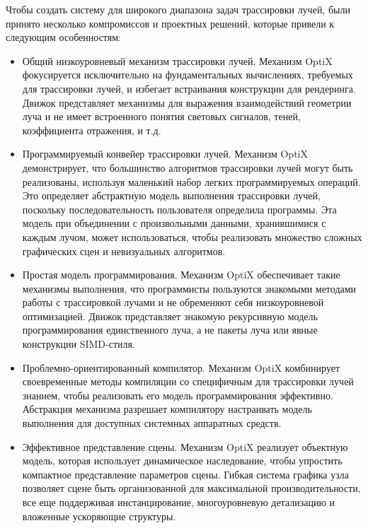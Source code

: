 Чтобы создать систему для широкого диапазона задач трассировки лучей, были принято несколько компромиссов и проектных решений, которые привели к следующим особенностям:
\begin{itemize}
 \item Общий низкоуровневый механизм трассировки лучей. 
 Механизм OptiX фокусируется исключительно на фундаментальных вычислениях, требуемых для трассировки лучей, и избегает встраивания конструкции для рендеринга. 
 Движок представляет механизмы для выражения взаимодействий геометрии луча и не имеет встроенного понятия световых сигналов, теней, коэффициента отражения, и т.д.

\item Программируемый конвейер трассировки лучей. 
Механизм OptiX демонстрирует, что большинство алгоритмов трассировки лучей могут быть реализованы, используя маленький набор легких программируемых операций. 
Это определяет абстрактную модель выполнения трассировки лучей, поскольку последовательность пользователя определила программы. 
Эта модель при объединении с произвольными данными, хранившимися с каждым лучом, может использоваться, чтобы реализовать множество сложных графических сцен и невизуальных алгоритмов.

\item Простая модель программирования. 
Механизм OptiX обеспечивает такие механизмы выполнения, что программисты пользуются знакомыми методами работы с трассировкой лучами и  не обременяют себя низкоуровневой оптимизацией. 
Движок представляет знакомую рекурсивную модель программирования единственного луча, а не пакеты луча или явные конструкции SIMD-стиля. 

\item Проблемно-ориентированный компилятор. 
Механизм OptiX комбинирует своевременные методы компиляции со специфичным для трассировки лучей знанием, чтобы реализовать его модель программирования эффективно. 
Абстракция механизма разрешает компилятору настраивать модель выполнения для доступных системных аппаратных средств.

\item Эффективное представление сцены. 
Механизм OptiX реализует объектную модель, которая использует динамическое наследование, чтобы упростить компактное представление параметров сцены. 
Гибкая система графика узла позволяет сцене быть организованной для максимальной производительности, все еще поддерживая инстанцирование, многоуровневую детализацию и вложенные ускоряющие структуры.

\end{itemize}


